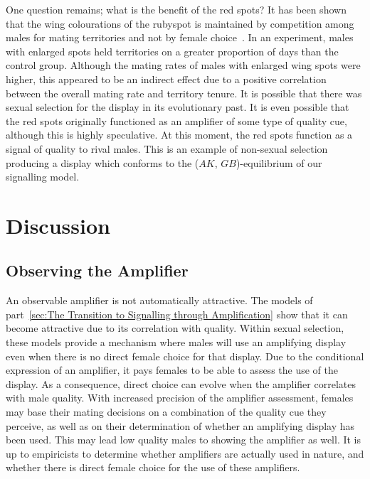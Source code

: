 \documentclass[a4paper,12pt]{article}
\numberwithin{equation}{section}
\begin{document}
One question remains; what is the benefit of the red spots? It has been shown that the wing colourations of the rubyspot is maintained by competition among males for mating territories and not by female choice~\cite{Grether1996}. In an experiment, males with enlarged spots held territories on a greater proportion of days than the control group. Although the mating rates of males with enlarged wing spots were higher, this appeared to be an indirect effect due to a positive correlation between the overall mating rate and territory tenure. It is possible that there was sexual selection for the display in its evolutionary past. It is even possible that the red spots originally functioned as an amplifier of some type of quality cue, although this is highly speculative. At this moment, the red spots function as a signal of quality to rival males. This is an example of non-sexual selection producing a display which conforms to the ($AK$, $GB$)-equilibrium of our signalling model.


\newpage\clearpage


\section{Discussion}
\label{sec:Part2/Discussion}
\subsection{Observing the Amplifier}
\label{sec:Observing the Amplifier}

An observable amplifier is not automatically attractive. The models of part~\ref{sec:The Transition to Signalling through Amplification} show that it can become attractive due to its correlation with quality. Within sexual selection, these models provide a mechanism where males will use an amplifying display even when there is no direct female choice for that display. Due to the conditional expression of an amplifier, it pays females to be able to assess the use of the display. As a consequence, direct choice can evolve when the amplifier correlates with male quality. With increased precision of the amplifier assessment, females may base their mating decisions on a combination of the quality cue they perceive, as well as on their determination of whether an amplifying display has been used. This may lead low quality males to showing the amplifier as well. It is up to empiricists to determine whether amplifiers are actually used in nature, and whether there is direct female choice for the use of these amplifiers.
\end{document}
